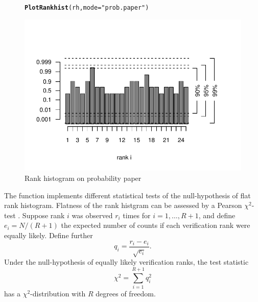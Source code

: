 \documentclass[article]{jss}\usepackage{graphicx, color}
\makeatletter
\def\maxwidth{ %
  \ifdim\Gin@nat@width>\linewidth
    \linewidth
  \else
    \Gin@nat@width
  \fi
}
\newcommand{\hlfunctioncall}[1]{\textcolor[rgb]{0,0.501960784313725,0.752941176470588}{\textbf{#1}}}%
\newcommand{\hlstring}[1]{\textcolor[rgb]{0.650980392156863,0.52156862745098,0}{#1}}%
\newenvironment{kframe}{%
 \def\at@end@of@kframe{}%
 \ifinner\ifhmode%
  \def\at@end@of@kframe{\end{minipage}}%
  \begin{minipage}{\columnwidth}%
 \fi\fi%
 \def\FrameCommand##1{\hskip\@totalleftmargin \hskip-\fboxsep
 \colorbox{shadecolor}{##1}\hskip-\fboxsep
     \hskip-\linewidth \hskip-\@totalleftmargin \hskip\columnwidth}%
 \MakeFramed {\advance\hsize-\width
   \@totalleftmargin\z@ \linewidth\hsize
   \@setminipage}}%
 {\par\unskip\endMakeFramed%
 \at@end@of@kframe}
\newenvironment{knitrout}{}{} %
\makeatother
\begin{document}
\begin{figure}
\begin{center}
%
\begin{knitrout}
\color{fgcolor}\begin{kframe}
\begin{alltt}
\hlfunctioncall{PlotRankhist}(rh, mode=\hlstring{"prob.paper"})
\end{alltt}
\end{kframe}
\includegraphics[width=\maxwidth]{figure/rank-hist-pp} 

\end{knitrout}

%
\end{center}
\caption{Rank histogram on probability paper}
\label{fig:rank-hist-pp}
\end{figure}


The function  implements different statistical tests of the null-hypothesis of flat rank histogram.
Flatness of the rank histgram can be assessed by a Pearson $\chi^2$-test \citep{pearson1900criterion}.
Suppose rank $i$ was observed $r_i$ times for $i=1,\dots,R+1$, and define $e_i=N/(R+1)$ the expected number of counts if each verification rank were equally likely.
Define further
\begin{equation}
q_i = \frac{r_i - e_i}{\sqrt{e_i}}.
\end{equation}
%
Under the null-hypothesis of equally likely verification ranks, the test statistic
%
\begin{equation}
\chi^2 = \sum_{i=1}^{R+1} q_i^2
\end{equation}
%
has a $\chi^2$-distribution with $R$ degrees of freedom.
\end{document}

